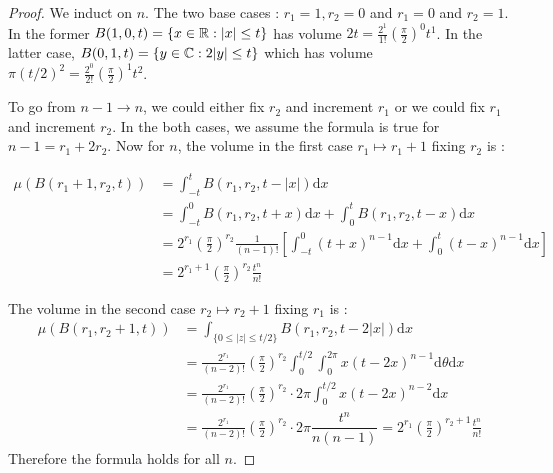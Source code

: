 \begin{proof}
  We induct on $n$. The two base cases : $r_1 = 1, r_2 = 0$ and $r_1 = 0$ and $r_2 = 1$. In the former $B(1,0,t) = \{x\in \mathbb{R} : |x|\leq t\}$ has volume $2t = \frac{2^1}{1!}\left(\frac{\pi}{2}\right)^0 t^1$. In the latter case,
  $B(0,1,t) = \{y\in \mathbb{C} : 2 |y| \leq t\}$ which has volume $\pi (t/2)^2 = \frac{2^0}{2!}\left(\frac{\pi}{2}\right)^1 t^2$.

  To go from $n-1\to n$, we could either fix $r_2$ and increment $r_1$ or we could fix $r_1$ and increment $r_2$. In the both cases, we assume the formula is true for $n-1 = r_1 + 2r_2$. Now for $n$, the volume in the first case $r_1 \mapsto r_1 + 1$ fixing $r_2$ is :

  \begin{align*}
    \mu(B(r_1+1,r_2, t)) &= \displaystyle\int_{-t}^t B(r_1, r_2, t-|x|)\mathrm{d}x \\
    &= \displaystyle\int_{-t}^0 B(r_1, r_2, t+x)\mathrm{d}x + \displaystyle\int_{0}^t B(r_1, r_2, t-x)\mathrm{d}x \\
    &= 2^{r_1}\left(\frac{\pi}{2}\right)^{r_2}\frac{1}{(n-1)!}\left[\displaystyle\int_{-t}^0 (t+x)^{n-1} \mathrm{d}x + \displaystyle\int_{0}^t(t-x)^{n-1} \mathrm{d}x\right] \\
    &= 2^{r_1+1}\left(\frac{\pi}{2}\right)^{r_2}\frac{t^n}{n!}
  \end{align*}

  \noindent The volume in the second case $r_2 \mapsto r_2 + 1$ fixing $r_1$ is :
  \begin{align*}
    \mu(B(r_1, r_2+1, t)) &= \displaystyle\int_{\{0\leq |z|\leq t/2\}} B(r_1, r_2, t-2|x|)\mathrm{d}x \\
    &= \frac{2^{r_1}}{(n-2)!}\left(\frac{\pi}{2}\right)^{r_2}\displaystyle\int_{0}^{t/2}\int_{0}^{2\pi}x(t-2x)^{n-1}\mathrm{d}\theta\mathrm{d}x \\
    &= \frac{2^{r_1}}{(n-2)!}\left(\frac{\pi}{2}\right)^{r_2}\cdot 2\pi \displaystyle\int_{0}^{t/2}x(t-2x)^{n-2}\mathrm{d}x \\
    &= \frac{2^{r_1}}{(n-2)!}\left(\frac{\pi}{2}\right)^{r_2}\cdot 2\pi  \dfrac{t^n}{n(n-1)} = 2^{r_1}\left(\frac{\pi}{2}\right)^{r_2+1}\frac{t^n}{n!}
  \end{align*}
  Therefore the formula holds for all $n$.
\end{proof}


